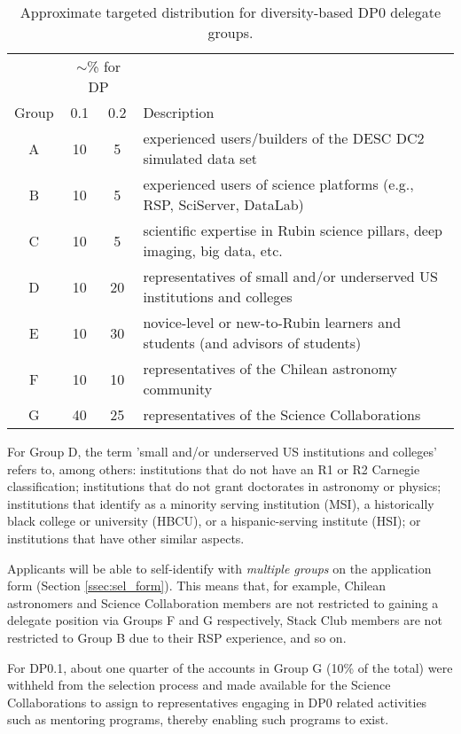 \documentclass[DM,lsstdraft,authoryear,toc]{lsstdoc}
\begin{document}
\begin{table}[!h]
\centering
\caption{Approximate targeted distribution for diversity-based DP0 delegate groups.}\label{tab:delegate_groups}
\begin{tabular}{cccl}
\hline
 & \multicolumn{2}{c}{$\sim$\% for DP} & \\
Group & 0.1 & 0.2 & Description \\
\hline \hline
A & 10 & 5 & experienced users/builders of the DESC DC2 simulated data set \\
B & 10 & 5 & experienced users of science platforms (e.g., RSP, SciServer, DataLab) \\
C & 10 & 5 & scientific expertise in Rubin science pillars, deep imaging, big data, etc. \\
D & 10 & 20 & representatives of small and/or underserved US institutions and colleges \\
E & 10 & 30 & novice-level or new-to-Rubin learners and students (and advisors of students) \\
F & 10 & 10 & representatives of the Chilean astronomy community \\
G & 40 & 25 & representatives of the Science Collaborations \\
\hline
\end{tabular}
\end{table}

For Group D, the term 'small and/or underserved US institutions and colleges' refers to, among others: institutions that do not have an R1 or R2 Carnegie classification; institutions that do not grant doctorates in astronomy or physics; institutions that identify as a minority serving institution (MSI), a historically black college or university (HBCU), or a hispanic-serving institute (HSI); or institutions that have other similar aspects.

Applicants will be able to self-identify with {\it multiple groups} on the application form (Section \ref{ssec:sel_form}).
This means that, for example, Chilean astronomers and Science Collaboration members are not restricted to gaining a delegate position via Groups F and G respectively, Stack Club members are not restricted to Group B due to their RSP experience, and so on.

For DP0.1, about one quarter of the accounts in Group G (10\% of the total) were withheld from the selection process and made available for the Science Collaborations to assign to representatives engaging in DP0 related activities such as mentoring programs, thereby enabling such programs to exist.
\end{document}
